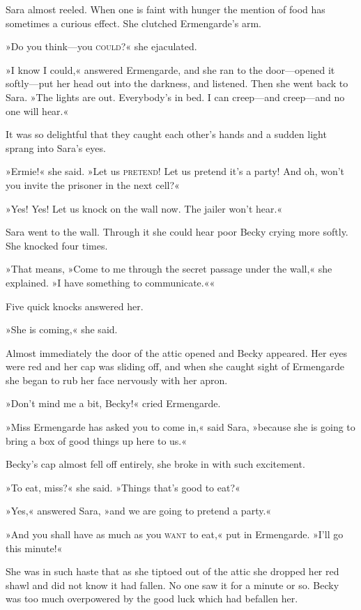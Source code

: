 Sara almost reeled. When one is faint with hunger the mention of food has sometimes a curious effect. She clutched Ermengarde's arm.

»Do you think—you \textsc{could}?« she ejaculated.

»I know I could,« answered Ermengarde, and she ran to the door—opened it softly—put her head out into the darkness, and listened. Then she went back to Sara. »The lights are out. Everybody's in bed. I can creep—and creep—and no one will hear.«

It was so delightful that they caught each other's hands and a sudden light sprang into Sara's eyes.

»Ermie!« she said. »Let us \textsc{pretend}! Let us pretend it's a party! And oh, won't you invite the prisoner in the next cell?«

»Yes! Yes! Let us knock on the wall now. The jailer won't hear.«

Sara went to the wall. Through it she could hear poor Becky crying more softly. She knocked four times.

»That means, »Come to me through the secret passage under the wall,« she explained. »I have something to communicate.««

Five quick knocks answered her.

»She is coming,« she said.

Almost immediately the door of the attic opened and Becky appeared. Her eyes were red and her cap was sliding off, and when she caught sight of Ermengarde she began to rub her face nervously with her apron.

»Don't mind me a bit, Becky!« cried Ermengarde.

»Miss Ermengarde has asked you to come in,« said Sara, »because she is going to bring a box of good things up here to us.«

Becky's cap almost fell off entirely, she broke in with such excitement.

»To eat, miss?« she said. »Things that's good to eat?«

»Yes,« answered Sara, »and we are going to pretend a party.«

»And you shall have as much as you \textsc{want} to eat,« put in Ermengarde. »I'll go this minute!«

She was in such haste that as she tiptoed out of the attic she dropped her red shawl and did not know it had fallen. No one saw it for a minute or so. Becky was too much overpowered by the good luck which had befallen her.


